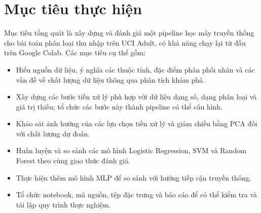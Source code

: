 \section{Mục tiêu thực hiện}
\label{sec:1_2}
Mục tiêu tổng quát là xây dựng và đánh giá một pipeline học máy truyền thống cho bài toán phân loại thu nhập trên UCI Adult, có khả năng chạy lại từ đầu trên Google Colab. Các mục tiêu cụ thể gồm:

\begin{itemize}
  \item Hiểu nguồn dữ liệu, ý nghĩa các thuộc tính, đặc điểm phân phối nhãn và các vấn đề về chất lượng dữ liệu thông qua phân tích khám phá.
  \item Xây dựng các bước tiền xử lý phù hợp với dữ liệu dạng số, dạng phân loại và giá trị thiếu; tổ chức các bước này thành pipeline có thể cấu hình.
  \item Khảo sát ảnh hưởng của các lựa chọn tiền xử lý và giảm chiều bằng PCA đối với chất lượng dự đoán.
  \item Huấn luyện và so sánh các mô hình Logistic Regression, SVM và Random Forest theo cùng giao thức đánh giá.
  \item Thực hiện thêm mô hình MLP để so sánh với hướng tiếp cận truyền thống.
  \item Tổ chức notebook, mã nguồn, tệp đặc trưng và báo cáo để có thể kiểm tra và tái lập quy trình thực nghiệm.
\end{itemize}
